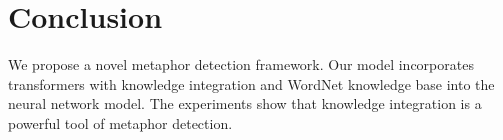 \documentclass[11pt,a4paper]{article}
\begin{document}
\section{Conclusion}
We propose a novel metaphor detection framework. Our model incorporates transformers with knowledge integration and WordNet knowledge base into the neural network model. The experiments show that knowledge integration is a powerful tool of metaphor detection.





\end{document}
